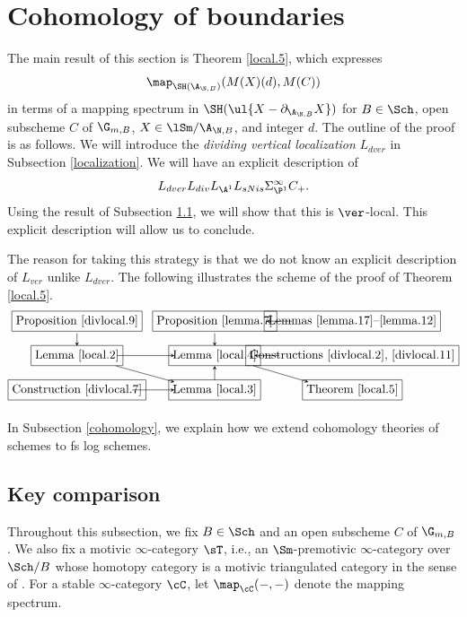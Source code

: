 \documentclass[10pt]{amsart}
\begin{document}
\section{Cohomology of boundaries}

The main result of this section is Theorem \ref{local.5}, which expresses
\begin{equation}
\label{boundary.0.1}
\map_{\SH(\A_{\N,B})}
(M(X)(d),M(C))
\end{equation}
in terms of a mapping spectrum in $\SH(\ul{X-\partial_{\A_{\N,B}}X})$ for $B\in \Sch$, open subscheme $C$ of $\G_{m,B}$, $X\in \lSm/\A_{\N,B}$, and integer $d$.
The outline of the proof is as follows.
We will introduce the \emph{dividing vertical localization} $L_{dver}$ in Subsection \ref{localization}.
We will have an explicit description of
\[
L_{dver}L_{div}L_{\A^1}L_{sNis}\Sigma_{\P^1}^\infty C_+.
\]
Using the result of Subsection \ref{key}, we will show that this is $\ver$-local.
This explicit description will allow us to conclude.

The reason for taking this strategy is that we do not know an explicit description of $L_{ver}$ unlike $L_{dver}$.
The following illustrates the scheme of the proof of Theorem \ref{local.5}.
\[
\begin{tikzpicture}
\node[draw,align=center] at (0,0)
{Proposition \ref{divlocal.9}};
\node[draw,align=center] at (4,0)
{Proposition \ref{lemma.7}};
\node[draw,align=center] at (8,0)
{Lemmas \ref{lemma.17}--\ref{lemma.12}};
\node[draw,align=center] at (0,-1)
{Lemma \ref{local.2}};
\node[draw,align=center] at (4,-1)
{Lemma \ref{local.4}};
\node[draw,align=center] at (8,-1)
{Constructions \ref{divlocal.2}, \ref{divlocal.11}};
\node[draw,align=center] at (0,-2)
{Construction \ref{divlocal.7}};
\node[draw,align=center] at (4,-2)
{Lemma \ref{local.3}};
\node[draw,align=center] at (8,-2)
{Theorem \ref{local.5}};
\draw [-stealth](0,-0.35) -- (0,-0.72);
\draw [-stealth](4,-0.35) -- (4,-0.72);
\draw [-stealth](4,-1.72) -- (4,-1.3);
\draw [-stealth](6.25,0) -- (5.5,0);
\draw [-stealth](5.88,-1) -- (5.15,-1);
\draw [-stealth](1.16,-1) -- (2.83,-1);
\draw [-stealth](1.6,-2) -- (2.83,-2);
\draw [-stealth](1.13,-1.3) -- (2.83,-1.77);
\draw [-stealth](5.13,-1.3) -- (6.72,-1.77);
\end{tikzpicture}
\]

In Subsection \ref{cohomology}, we explain how we extend cohomology theories of schemes to fs log schemes.


\subsection{Key comparison}
\label{key}
Throughout this subsection, we fix $B\in \Sch$ and an open subscheme $C$ of $\G_{m,B}$.
We also fix a motivic $\infty$-category $\sT$, i.e., an $\Sm$-premotivic $\infty$-category over $\Sch/B$ whose homotopy category is a motivic triangulated category in the sense of \cite[Definition 2.4.45]{CD19}.
For a stable $\infty$-category $\cC$, let $\map_{\cC}(-,-)$ denote the mapping spectrum.
\end{document}
